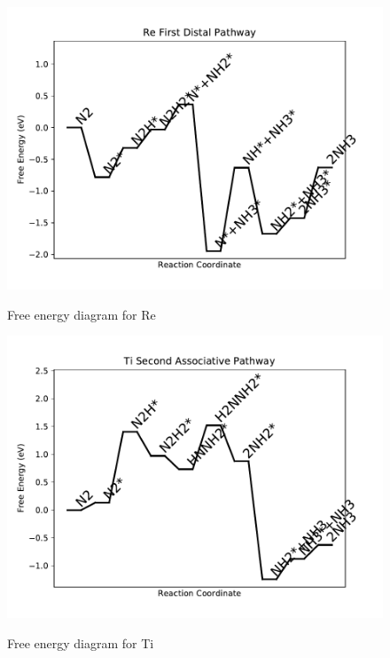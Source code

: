 \documentclass{article}
\begin{document}
\begin{figure}
\includegraphics[width=1\linewidth]{data/plots/Re_distal_1.pdf}
\label{fig:Re_distal_1}
\caption{Free energy diagram for Re}
\end{figure}

\begin{figure}
\includegraphics[width=1\linewidth]{data/plots/Ti_associative_2.pdf}
\label{fig:Ti_associative_2}
\caption{Free energy diagram for Ti}
\end{figure}
\end{document}
